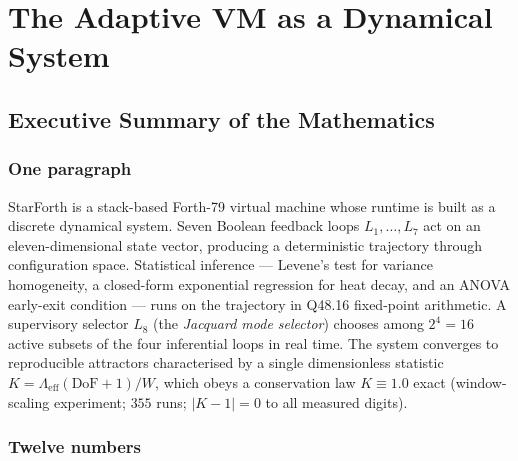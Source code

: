 \documentclass[11pt,letterpaper,openany]{book}
\theoremstyle{definition}
\theoremstyle{plain}
\newcommand{\Lambdaeff}{\Lambda_{\mathrm{eff}}}
\newcommand{\Loop}[1]{L_{#1}}
\begin{document}
\clearpage

\mainmatter

\part{The Adaptive VM as a Dynamical System}

\chapter{Executive Summary of the Mathematics}
\label{ch:exec-summary}

\section{One paragraph}

StarForth is a stack-based Forth-79 virtual machine whose runtime is built
as a discrete dynamical system. Seven Boolean feedback loops
$\Loop{1},\dots,\Loop{7}$ act on an eleven-dimensional state vector,
producing a deterministic trajectory through configuration space.
Statistical inference --- Levene's test for variance homogeneity, a
closed-form exponential regression for heat decay, and an ANOVA early-exit
condition --- runs on the trajectory in Q48.16 fixed-point arithmetic.
A supervisory selector $\Loop{8}$ (the \emph{Jacquard mode selector})
chooses among $2^4 = 16$ active subsets of the four inferential loops in
real time. The system converges to reproducible attractors characterised
by a single dimensionless statistic $K = \Lambdaeff(\mathrm{DoF}+1)/W$,
which obeys a conservation law $K \equiv 1.0$ exact (window-scaling
experiment; $355$ runs; $|K-1| = 0$ to all measured digits).

\section{Twelve numbers}
\end{document}
